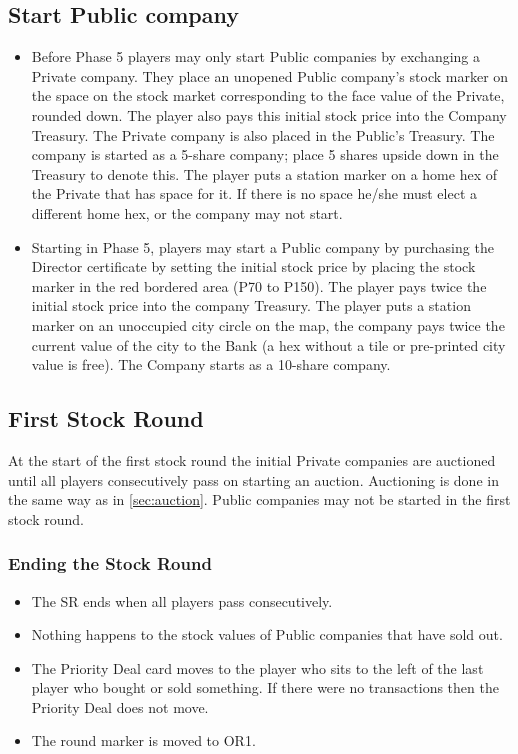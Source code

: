 \documentclass[a4paper,twocolumn]{article}
\begin{document}
\subsection{Start Public company}
\begin{itemize}
	\item Before Phase 5 players may only start Public companies by exchanging a
	Private company. They place an unopened Public company's stock marker on the
	space on the stock market corresponding to the face value of the Private,
	rounded down. The player also pays this initial stock price into the Company
	Treasury. The Private company is also placed in the Public's Treasury. The
	company is started as a 5-share company; place 5 shares upside down in the
	Treasury to denote this. The player puts a station marker on a home hex of
	the Private that has space for it. If there is no space he/she must elect a
	different home hex, or the company may not start.
	\item Starting in Phase 5, players may start a Public company by purchasing
	the Director certificate by setting the initial stock price by placing the
	stock marker in the red bordered area (P70 to P150). The player pays twice
	the initial stock price into the company Treasury. The player puts a station
	marker on an unoccupied city circle on the map, the company pays twice the
	current value of the city to the Bank (a hex without a tile or pre-printed
	city value is free). The Company starts as a 10-share company.
\end{itemize}

\subsection{First Stock Round}
At the start of the first stock round the initial Private companies are
auctioned until all players consecutively pass on starting an auction.
Auctioning is done in the same way as in \autoref{sec:auction}. Public companies
may not be started in the first stock round.

\subsubsection{Ending the Stock Round}
\begin{itemize}
	\item The SR ends when all players pass consecutively.
	\item Nothing happens to the stock values of Public companies that have sold
	out.
	\item The Priority Deal card moves to the player who sits to the left of the
	last player who bought or sold something. If there were no transactions then
	the Priority Deal does not move.
	\item The round marker is moved to OR1.
\end{itemize}
\end{document}
